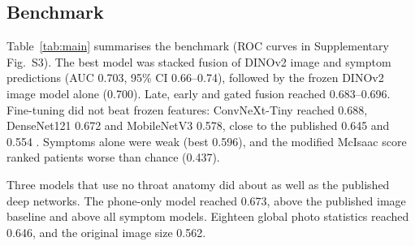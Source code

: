 \documentclass[preprint,12pt]{elsarticle}
\begin{document}
\subsection{Benchmark}

Table~\ref{tab:main} summarises the benchmark (ROC curves in Supplementary Fig.~S3). The best model was stacked fusion of DINOv2 image and symptom predictions (AUC 0.703, 95\% CI 0.66--0.74), followed by the frozen DINOv2 image model alone (0.700). Late, early and gated fusion reached 0.683--0.696. Fine-tuning did not beat frozen features: ConvNeXt-Tiny reached 0.688, DenseNet121 0.672 and MobileNetV3 0.578, close to the published 0.645 and 0.554 \cite{shojaei2025pgu}. Symptoms alone were weak (best 0.596), and the modified McIsaac score ranked patients worse than chance (0.437).

Three models that use no throat anatomy did about as well as the published deep networks. The phone-only model reached 0.673, above the published image baseline and above all symptom models. Eighteen global photo statistics reached 0.646, and the original image size 0.562.
\end{document}
